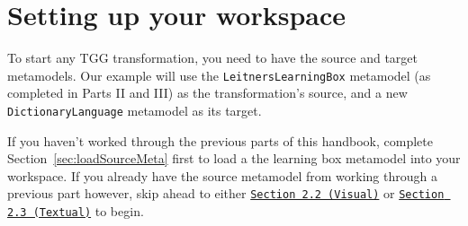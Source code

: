 \newpage
\section{Setting up your workspace}
\genHeader

To start any TGG transformation, you need to have the source and target metamodels. Our example will use the \texttt{LeitnersLearningBox} metamodel (as
completed in Parts II and III) as the transformation's source, and a new \texttt{DictionaryLanguage} metamodel as its target.

If you haven't worked through the previous parts of this handbook, complete Section~\ref{sec:loadSourceMeta} first to load a the learning box metamodel into
your workspace. If you already have the source metamodel from working through a previous part however, skip ahead to either
\texttt{\hyperlink{sec:multiEAP}{Section 2.2 (Visual)}} or \texttt{\hyperlink{sec:multiMOSL}{Section 2.3 (Textual)}} to begin.

\vspace{0.5cm}








